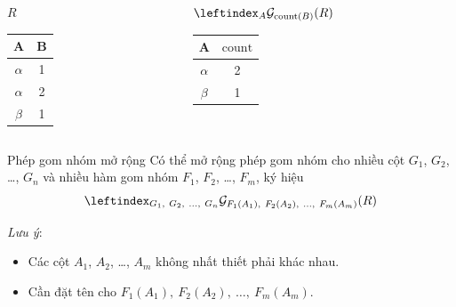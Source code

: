 \documentclass[11pt, handout]{beamer}
\begin{document}
  \begin{frame}
    \begin{columns}[T]
      \begin{column}{0.4\textwidth}
        \centering $R$
        \bigskip \\
        \begin{tabular}{|c|c|}
          \hline
          $\textbf{A}$ & $\textbf{B}$ \\[0.5ex] \hline\hline
          $\alpha$ & 1 \\ \hline
          $\alpha$ & 2 \\ \hline
          $\beta$ & 1 \\ \hline
        \end{tabular}
      \end{column}
      \begin{column}{0.6\textwidth}
        \centering $\leftindex_{A}{\mathcal{G}}_{\mathrm{count}(B)} (R)$
        \medskip \\
        \begin{tabular}{|c|c|}
          \hline
          $\textbf{A}$ & $\mathrm{count}$ \\[0.5ex] \hline\hline
          $\alpha$ & 2 \\ \hline
          $\beta$ & 1 \\ \hline
        \end{tabular}
      \end{column}
    \end{columns}
  \end{frame}
  \begin{frame}{Phép gom nhóm mở rộng}
    Có thể mở rộng phép gom nhóm cho nhiều cột $G_1$, $G_2$, \dots, $G_n$ và 
    nhiều hàm gom nhóm $F_1$, $F_2$, \dots, $F_m$, ký hiệu
    $$
    \leftindex_{G_1,\ G_2,\ \dots,\ G_n}{\mathcal{G}}_{F_1(A_1),\ F_2(A_2),\ \dots,\ F_m(A_m)} (R)
    $$
  \end{frame}
  \begin{frame}
    \textit{Lưu ý}:
    \begin{itemize}
      \item Các cột $A_1$, $A_2$, \dots, $A_m$ không nhất thiết phải khác nhau.
      \item Cần đặt tên cho $F_1(A_1),\ F_2(A_2),\ \dots,\ F_m(A_m)$.
    \end{itemize} 
  \end{frame}
\end{document}
